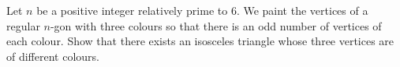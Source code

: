 Let $n$ be a positive integer relatively prime to $6$. We paint the vertices of a regular $n$-gon with three colours so that there is an odd number of vertices of each colour. Show that there exists an isosceles triangle whose three vertices are of different colours.
